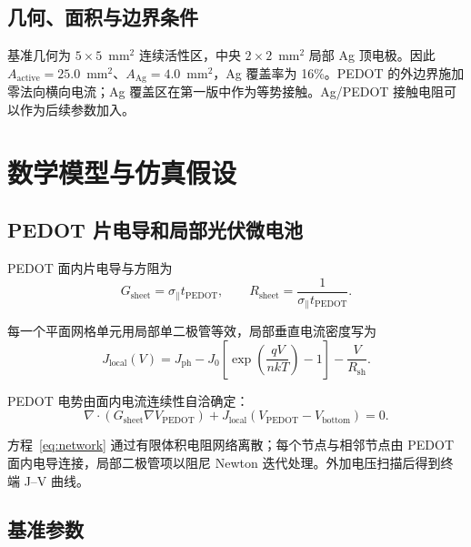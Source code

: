 \documentclass[UTF8,a4paper,11pt]{ctexart}
\newcommand{\sigpar}{\sigma_{\parallel}}
\newcommand{\Rs}{R_{\mathrm{sheet}}}
\newcommand{\Aag}{A_{\mathrm{Ag}}}
\newcommand{\Aactive}{A_{\mathrm{active}}}
\begin{document}
\subsection{几何、面积与边界条件}

基准几何为 $5\times5$~mm$^2$ 连续活性区，中央 $2\times2$~mm$^2$ 局部 Ag 顶电极。因此 $\Aactive=25.0$~mm$^2$、$\Aag=4.0$~mm$^2$，Ag 覆盖率为 16\%。PEDOT 的外边界施加零法向横向电流；Ag 覆盖区在第一版中作为等势接触。Ag/PEDOT 接触电阻可以作为后续参数加入。

\section{数学模型与仿真假设}

\subsection{PEDOT 片电导和局部光伏微电池}

PEDOT 面内片电导与方阻为
\begin{equation}
G_{\mathrm{sheet}}=\sigpar t_{\mathrm{PEDOT}},\qquad
\Rs=\frac{1}{\sigpar t_{\mathrm{PEDOT}}}.
\end{equation}

每一个平面网格单元用局部单二极管等效，局部垂直电流密度写为
\begin{equation}
J_{\mathrm{local}}(V)=J_{\mathrm{ph}}-J_0\left[\exp\left(\frac{qV}{nkT}\right)-1\right]-\frac{V}{R_{\mathrm{sh}}}.
\label{eq:diode}
\end{equation}

PEDOT 电势由面内电流连续性自洽确定：
\begin{equation}
\nabla\cdot\left(G_{\mathrm{sheet}}\nabla V_{\mathrm{PEDOT}}\right)
+J_{\mathrm{local}}\left(V_{\mathrm{PEDOT}}-V_{\mathrm{bottom}}\right)=0.
\label{eq:network}
\end{equation}

方程~\eqref{eq:network} 通过有限体积电阻网络离散；每个节点与相邻节点由 PEDOT 面内电导连接，局部二极管项以阻尼 Newton 迭代处理。外加电压扫描后得到终端 J--V 曲线。

\subsection{基准参数}
\end{document}
